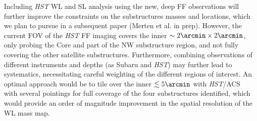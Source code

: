 \documentclass[iop,twocolumn]{emulateapj}
\begin{document}
Including {\it HST} WL and SL analysis using the new, deep FF observations will further improve the constraints on the substructures masses and locations, which we plan to pursue in a subsequent paper (Merten et al. in prep). However, the current FOV of the {\it HST} FF imaging covers the inner $\sim2\arcmin\times2\arcmin$, only probing the Core and part of the NW substructure region, and not fully covering the other satellite substructures. Furthermore, combining  observations of different instruments and depths (as Subaru and {\it HST}) may further lead to systematics, necessitating careful weighting of the different regions of interest.  An optimal approach would be to tile over the inner $\lesssim5\arcmin$ with {\it HST}/ACS with several pointings for full coverage of the four substructures identified, which would provide an order of magnitude improvement in the spatial resolution of the WL mass map.



\end{document}
